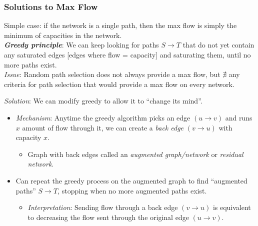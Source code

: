 \documentclass[12pt]{extarticle}
\theoremstyle{definition}
\theoremstyle{remark}
\begin{document}
\subsubsection*{Solutions to Max Flow}
\noindent Simple case: if the network is a single path, then the max flow is simply the minimum of capacities in the network.\\

\noindent \textit{\textbf{Greedy principle}}: We can keep looking for paths $S\to T$ that do not yet contain any saturated edges [edges where flow = capacity] and saturating them, until no more paths exist.\\

\noindent \textit{Issue}: Random path selection does not always provide a max flow, but $\nexists$ any criteria for path selection that would provide a max flow on every network.

\noindent\textit{Solution}: We can modify greedy to allow it to ``change its mind''.\begin{itemize}
    \item \textit{Mechanism}: Anytime the greedy algorithm picks an edge $(u\to v)$ and runs $x$ amount of flow through it, we can create a \textit{back edge} $(v\to u)$ with capacity $x$. \begin{itemize}
        \item Graph with back edges called an \textit{augmented graph/network} or \textit{residual network}.
    \end{itemize}
    \item Can repeat the greedy process on the augmented graph to find ``augmented paths'' $S\to T$, stopping when no more augmented paths exist. \begin{itemize}
        \item \textit{Interpretation}: Sending flow through a back edge $(v\to u)$ is equivalent to decreasing the flow sent through the original edge $(u\to v)$.
    \end{itemize}
\end{itemize}
\end{document}
